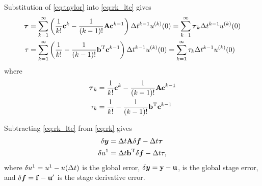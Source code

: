 Substitution of \eqref{eq:taylor} into \eqref{eq:rk_lte} gives
\begin{subequations} \label{eq:ste}
\begin{align}
\boldsymbol{\tau} & = \sum_{k=1}^\infty \left( \frac{1}{k!} \mathbf{c}^k - \frac{1}{(k-1)!} \mathbf{A} \mathbf{c}^{k-1}\right) \Delta t^{k-1} u^{(k)}(0) = \sum_{k=1}^\infty \boldsymbol{\tau}_k \Delta t^{k-1} u^{(k)}(0) \\
\tau & = \sum_{k=1}^\infty \left( \frac{1}{k!} - \frac{1}{(k-1)!} \mathbf{b}^\mathrm{T} \mathbf{c}^{k-1}\right) \Delta t^{k-1} u^{(k)}(0) = \sum_{k=1}^\infty \tau_k \Delta t^{k-1} u^{(k)}(0)
\end{align}
\end{subequations} 
where 
\begin{subequations} 
\begin{align} \label{eq:ste_coeffs}
\boldsymbol{\tau}_k & = \frac{1}{k!} \mathbf{c}^k - \frac{1}{(k-1)!} \mathbf{A} \mathbf{c}^{k-1} \\
\tau_k & = \frac{1}{k!} - \frac{1}{(k-1)!} \mathbf{b}^\mathrm{T} \mathbf{c}^{k-1}
\end{align}
\end{subequations} 

Subtracting \eqref{eq:rk_lte} from \eqref{eq:rk} gives
\begin{subequations} \label{eq:gserr_series}
\begin{align}
\delta\boldsymbol{y} & = \Delta t \mathbf{A} \delta\boldsymbol{f} - \Delta t \boldsymbol{\tau} \\
\delta u^{1} & = \Delta t \mathbf{b}^\mathrm{T} \delta\boldsymbol{f} - \Delta t \tau,
\end{align}
\end{subequations}
where $\delta u^{1}=u^{1}-u(\Delta t)$ is the global error,
$\delta\boldsymbol{y} = \mathbf{y}-\mathbf{u}$, is the global stage error, and
$\delta\boldsymbol{f} = \mathbf{f}-\mathbf{u}'$ is the stage derivative error.


